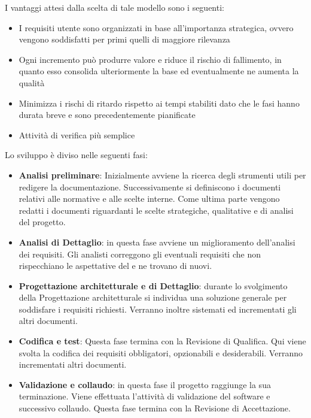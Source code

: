 I vantaggi attesi dalla scelta di tale modello sono i seguenti:

\begin{itemize}
\item I requisiti utente sono organizzati in base all’importanza strategica, ovvero vengono soddisfatti per primi quelli di maggiore rilevanza
\item Ogni incremento può produrre valore e riduce il rischio di fallimento, in quanto esso
consolida ulteriormente la base ed eventualmente ne aumenta la qualità
\item Minimizza i rischi di ritardo rispetto ai tempi stabiliti dato che le fasi hanno durata breve e sono precedentemente pianificate
\item Attività di verifica più semplice
\end{itemize}
Lo sviluppo è diviso nelle seguenti fasi:
\begin{itemize}
\item \textbf{Analisi preliminare}: Inizialmente avviene la ricerca degli strumenti utili per redigere la documentazione. Successivamente si definiscono i documenti relativi alle normative e alle scelte interne. Come ultima parte vengono redatti i documenti riguardanti le scelte strategiche, qualitative e di analisi del progetto.
\item \textbf{Analisi di Dettaglio}: in questa fase avviene un miglioramento dell'analisi dei requisiti. Gli analisti correggono gli eventuali requisiti che non rispecchiano le aspettative del  e ne trovano di nuovi.
\item \textbf{Progettazione architetturale e di Dettaglio}: durante lo svolgimento della Progettazione architetturale si individua una soluzione generale per soddisfare i requisiti richiesti. Verranno inoltre sistemati ed incrementati gli altri documenti.
\item \textbf{Codifica e test}: Questa fase termina con la Revisione di Qualifica. Qui viene svolta la codifica dei requisiti obbligatori, opzionabili e desiderabili. Verranno incrementati altri documenti. 
\item \textbf{Validazione e collaudo}: in questa fase il progetto raggiunge la sua terminazione. Viene effettuata l'attività di validazione del software e successivo collaudo. Questa fase termina con la Revisione  di Accettazione. 
\end{itemize}

